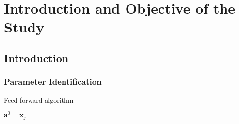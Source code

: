 \chapter{Introduction and Objective of the Study}

\section{Introduction}\label{sec:Introduction}

\subsection{Parameter Identification}


\begin{algorithm}[H]
\caption{Feed forward algorithm}
\label{alg:FeedForward}
\begin{algorithmic}[1] 

        \State $\mathbf{a}^0 = \mathbf{x}_j$\;
\EndFor

\end{algorithmic}
\end{algorithm}


